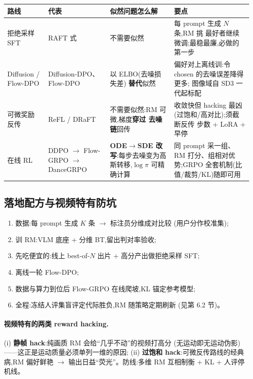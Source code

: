 \documentclass[UTF8, 11pt]{ctexart}
\begin{document}
\begin{center}
\begin{tabular}{@{}p{}p{}p{}p{}@{}}
\toprule
路线 & 代表 & 似然问题怎么解 & 要点 \\
\midrule
拒绝采样 SFT & RAFT 式 & 不需要似然 & 每 prompt 生成 $N$ 条,RM 挑
最好者继续微调;最稳最廉,必做的第一步 \\
Diffusion / Flow-DPO & Diffusion-DPO、Flow-DPO & 以 ELBO(去噪损失差)
\textbf{替代}似然 & 偏好对上离线训:令 chosen 的去噪误差降得更多;
图像域自 SD3 一代起标配 \\
可微奖励反传 & ReFL / DRaFT & 不需要似然:RM 可微,梯度\textbf{穿过
去噪链}回传 & 收敛快但 hacking 最凶(过饱和/高对比);须截断反传
步数 + LoRA + 早停 \\
在线 RL & DDPO $\to$ Flow-GRPO $\to$ DanceGRPO & \textbf{ODE$\to$SDE
改写}:每步去噪变为高斯转移,$\log\pi$ 可精确计算 & 同 prompt 采一组、
RM 打分、组相对优势;GRPO 全套机制(比值/裁剪/KL)随即可用 \\
\bottomrule
\end{tabular}
\end{center}

\subsection{落地配方与视频特有防坑}

\begin{enumerate}
  \item 数据:每 prompt 生成 $K$ 条 $\to$ 标注员分维成对比较
        (用户分作校准集);
  \item 训 RM:VLM 底座 + 分维 BT,留出判对率验收;
  \item 先吃便宜的:线上 best-of-$N$ 出片 + 高分产出做拒绝采样 SFT;
  \item 离线一轮 Flow-DPO;
  \item 数据与算力到位后 Flow-GRPO 在线爬坡,KL 锚定参考模型;
  \item 全程:冻结人评集盲评定代际胜负,RM 随策略定期刷新
        (见第 6.2 节)。
\end{enumerate}

\paragraph{视频特有的两类 reward hacking.}
(i) \textbf{静帧 hack}:纯画质 RM 会给``几乎不动''的视频打高分
(无运动即无运动伪影)——这正是运动质量必须单列一维的原因;
(ii) \textbf{过饱和 hack}:可微反传路线的经典病,RM 偏好鲜艳
$\to$ 输出日益``荧光''。防线:多维 RM 互相制衡 + KL + 人评停机线。
\end{document}
